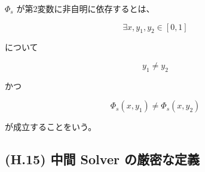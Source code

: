 \documentclass[a4paper,11pt]{article}
\begin{document}
$\Phi_s$ が第2変数に非自明に依存するとは、

\begin{equation}
    \exists x,y_1,y_2\in[0,1]
\end{equation}

について

\begin{equation}
    y_1\neq y_2
\end{equation}

かつ

\begin{equation}
    \boxed{
        \Phi_s(x,y_1)
        \neq
        \Phi_s(x,y_2)
    }
    \label{eq:H-nontrivial-continuous}
\end{equation}

が成立することをいう。


\subsection{(H.15) 中間 Solver の厳密な定義}
\label{subsec:H15}
\end{document}
